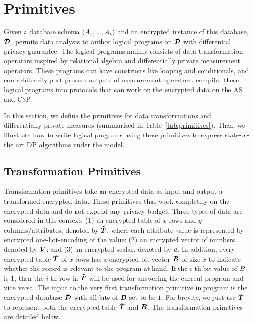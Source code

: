 
\section{\system Primitives}\label{sec:primitives}

Given a database schema $\langle A_1,\ldots,A_k \rangle$ and an encrypted instance of this database, $\boldsymbol{\tilde{\mathcal{D}}}$, \system permits data analysts to author logical programs on $\boldsymbol{\tilde{\mathcal{D}}}$ with differential privacy guarantee.  The logical programs mainly consists of data transformation operators inspired by relational algebra and differentially private measurement operators. These programs can  have constructs like looping and conditionals, and can arbitrarily post-process outputs of measurement operators. \system compiles these logical programs into \system protocols that can work on the encrypted data on the \textsf{AS} and \textsf{CSP}.

In this section, we define the primitives for data transformations and differentially private measures (summarized in Table~\ref{tab:primitives}). Then, we illustrate how to write logical programs using these primitives to express state-of-the art DP algorithms under the \cdp model.



\subsection{Transformation Primitives}\label{sec:transformation_primitives}
Transformation primitives take an encrypted data as input and output a transformed encrypted data.  These primitives thus work completely on the encrypted data and do not expend any privacy budget. Three types of data are considered in this context: (1) an encrypted table of $x$ rows and $y$ columns/attributes, denoted by $\boldsymbol{\tilde{T}}$, where each attribute value is represented by encrypted one-hot-encoding of the value; (2) an encrypted vector of numbers, denoted by $\boldsymbol{V}$; and (3) an encrypted scalar, denoted by $\boldsymbol{c}$. In addition, every encrypted table $\boldsymbol{\tilde{T}}$ of $x$ rows has a encrypted bit vector $\boldsymbol{B}$ of size $x$ to indicate whether the record is relevant to the program at hand. If the $i$-th bit value of $B$ is $1$, then the $i$-th row in $\boldsymbol{\tilde{T}}$ will be used for answering the current program and vice versa. The input to the very first transformation primitive in \system program is the encrypted database $\boldsymbol{\tilde{\mathcal{D}}}$ with all bits of $\boldsymbol{B}$ set to be $1$. For brevity, we just use $\boldsymbol{\tilde{T}}$ to represent both the encrypted table $\boldsymbol{\tilde{T}}$ and $\boldsymbol{B}$. The transformation primitives are detailed below.

